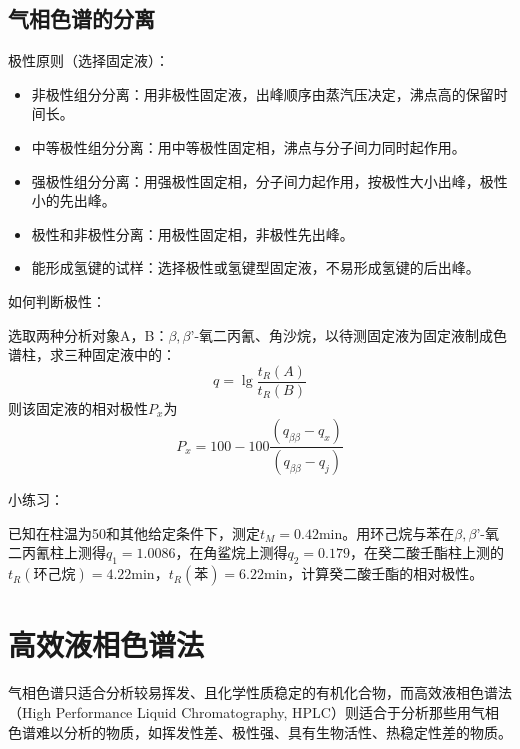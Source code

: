 \subsection{气相色谱的分离}
极性原则（选择固定液）：
\begin{itemize}
	\item 非极性组分分离：用非极性固定液，出峰顺序由蒸汽压决定，沸点高的保留时间长。
	\item 中等极性组分分离：用中等极性固定相，沸点与分子间力同时起作用。
	\item 强极性组分分离：用强极性固定相，分子间力起作用，按极性大小出峰，极性小的先出峰。
	\item 极性和非极性分离：用极性固定相，非极性先出峰。
	\item 能形成氢键的试样：选择极性或氢键型固定液，不易形成氢键的后出峰。
\end{itemize}

如何判断极性：

\begin{example}
	选取两种分析对象A，B：$\beta,\beta’$-氧二丙氰、角沙烷，以待测固定液为固定液制成色谱柱，求三种固定液中的：
	\begin{equation*}
		q=\lg⁡\dfrac{t_R (A)}{t_R (B)}
	\end{equation*}
	则该固定液的相对极性$P_x$为
	\begin{equation*}
		P_x=100-100 \dfrac{(q_{\beta\beta}-q_x)}{(q_{\beta\beta}-q_j)}
	\end{equation*}
\end{example}

\noindent 小练习：
\begin{example}
	已知在柱温为50\textcelsius 和其他给定条件下，测定$t_M=0.42$min。用环己烷与苯在$\beta,\beta’$-氧二丙氰柱上测得$q_1=1.0086$，在角鲨烷上测得$q_2=0.179$，在癸二酸壬酯柱上测的$t_R(\text{环己烷})=4.22$min，$t_R(\text{苯})=6.22$min，计算癸二酸壬酯的相对极性。
\end{example}

\section{高效液相色谱法}

气相色谱只适合分析较易挥发、且化学性质稳定的有机化合物，而高效液相色谱法（High Performance Liquid Chromatography, HPLC）则适合于分析那些用气相色谱难以分析的物质，如挥发性差、极性强、具有生物活性、热稳定性差的物质。

